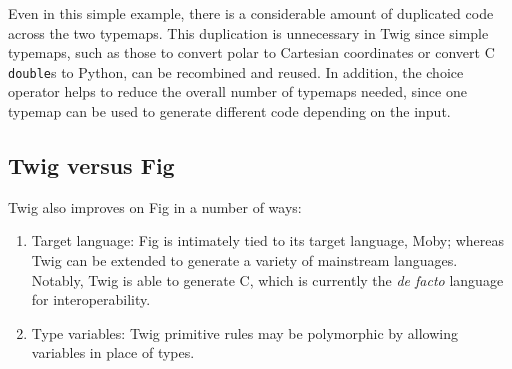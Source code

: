 Even in this simple example, there is a considerable amount of
duplicated code across the two typemaps. This duplication is
unnecessary in Twig since simple typemaps, such as those to
convert polar to Cartesian coordinates or convert C
\texttt{double}s to Python, can be recombined and reused. In
addition, the choice operator helps to reduce the overall number
of typemaps needed, since one typemap can be used to generate
different code depending on the input.

\subsection{Twig versus Fig}

Twig also improves on Fig in a number of ways:

\begin{enumerate}

\item Target language: Fig is intimately tied to its target
language, Moby; whereas Twig can be extended to generate a variety
of mainstream languages. Notably, Twig is able to generate C,
which is currently the \emph{de facto} language for
interoperability.

\item Type variables: Twig primitive rules may be polymorphic by
allowing variables in place of types.

\end{enumerate}

